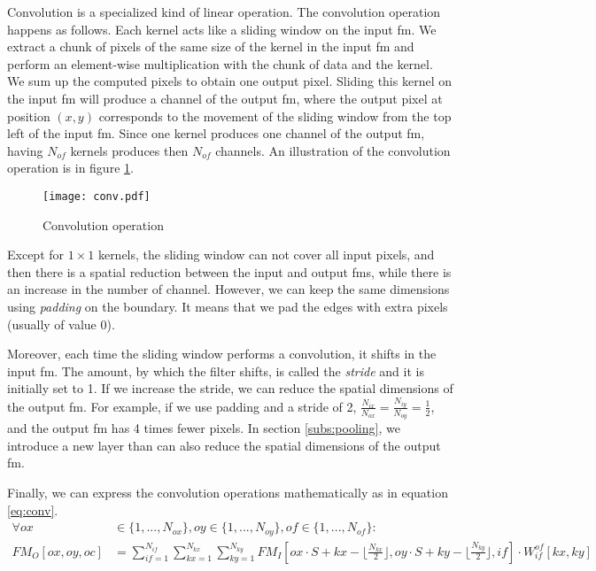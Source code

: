 Convolution is a specialized kind of linear operation. The convolution operation happens as follows. Each kernel acts like a sliding window on the input \acrshort{fm}. We extract a chunk of pixels of the same size of the kernel in the input \acrshort{fm} and perform an element-wise multiplication with the chunk of data and the kernel. We sum up the computed pixels to obtain one output pixel. Sliding this kernel on the input \acrshort{fm} will produce a channel of the output \acrshort{fm}, where the output pixel at position $(x, y)$ corresponds to the movement of the sliding window from the top left of the input \acrshort{fm}. Since one kernel produces one channel of the output \acrshort{fm}, having $N_{of}$ kernels produces then $N_{of}$ channels. An illustration of the convolution operation is in figure \ref{fig:convolution}.
%
\begin{figure}
    \centering
    \texttt{[image: conv.pdf]}
    \caption{Convolution operation}
    \label{fig:convolution}
\end{figure}

Except for $1 \times 1$ kernels, the sliding window can not cover all input pixels, and then there is a spatial reduction between the input and output \acrshort{fm}s, while there is an increase in the number of channel. However, we can keep the same dimensions using \textit{padding} on the boundary. It means that we pad the edges with extra pixels (usually of value 0).

Moreover, each time the sliding window performs a convolution, it shifts in the input \acrshort{fm}. The amount, by which the filter shifts, is called the \textit{stride} and it is initially set to 1. If we increase the stride, we can reduce the spatial dimensions of the output \acrshort{fm}. For example, if we use padding and a stride of 2, $\frac{N_{ix}}{N_{ox}} = \frac{N_{iy}}{N_{oy}} = \frac{1}{2}$, and the output \acrshort{fm} has 4 times fewer pixels. In section \ref{subs:pooling}, we introduce a new layer than can also reduce the spatial dimensions of the output \acrshort{fm}.

Finally, we can express the convolution operations mathematically as in equation \eqref{eq:conv}.
%
\begin{equation}
    \begin{split}
        \forall ox &\in \{ 1, ..., N_{ox} \}, oy \in \{ 1, ..., N_{oy} \}, of \in \{ 1, ..., N_{of} \} : \\
        FM_O[ox, oy, oc] &= \sum^{N_{if}}_{if=1}
        \sum^{N_{kx}}_{kx=1}
        \sum^{N_{ky}}_{ky=1}
        FM_I[ox \cdot S + kx - \lfloor \frac{N_{kx}}{2} \rfloor,  oy \cdot S + ky - \lfloor \frac{N_{ky}}{2} \rfloor, if] \cdot
        W^{of}_{if}[kx, ky]
    \end{split}
    \label{eq:conv}
\end{equation}

